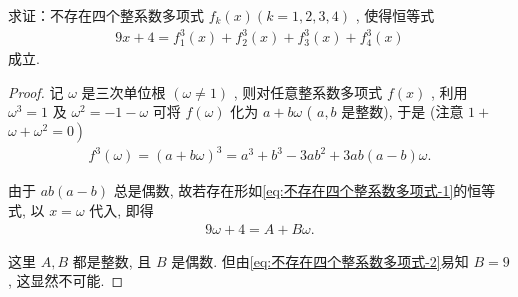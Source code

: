 \begin{comment}
\begin{example}
	试求一切有序正整数对 $(n, k)$, 使得 $x^n+x+1$ 被 $x^k+x+1$ 整除.
\end{example}
\begin{solution}
	显然,  $n \geqslant k$ .
	当 $n>k$ 时, 设 $\omega$ 是 $x^k+x+1=0$ 的一个根, 则 $\omega \neq 0, \omega^n+\omega+1=0$,于是
	\begin{align*}
		\omega^n-\omega^k=\omega^k\left(\omega^{n-k}-1\right)=0 .
	\end{align*}

	从而有
	\begin{align*}
		\omega^{n-k}=1 .
	\end{align*}

	由 $|\omega|^{n-k}=\left|\omega^{n-k}\right|=1$, 知 $|\omega|=1$ .
	由 $1=|\omega|^k=\left|\omega^k\right|=|\omega+1|$, 可知 $\omega$ 的实部为 $-\frac{1}{2}$, 则 $k \geqslant 2$.
	$\omega_1=\frac{-1+\sqrt{3} \mathrm{i}}{2}$ 或 $\omega_2=\frac{-1-\sqrt{3} \mathrm{i}}{2}$ 是 $x^k+x+1=0$ 的所有根, 从而有
	\begin{align*}
		x^k+x+1=\left(x-\omega_1\right)^{k_1}\left(x-\omega_2\right)^{k-k_1}, k_1 \in \mathbb{Z}, 0 \leqslant k_1 \leqslant k .
	\end{align*}

	若 $k>2$, 考虑上面等式两边含 $x^{k-1}$ 的项的系数, 便有 $k_1 \omega_1+\left(k-k_1\right) \omega_2=$ 0 , 考虑实部即有 $k=0$, 产生矛盾.

	若 $k=2$, 令 $n \equiv l(\bmod 3), 0 \leqslant l<3$. 由 $\omega^n+\omega+1=\omega^l+\omega+1=0$,得 $l=2, n \equiv 2(\bmod 3)$ .
	故知 $(n, k)=(k, k)$ 或 $(3 m+2,2), m$ 是正整数.
\end{solution}
\end{comment}

\begin{example}
	求证：不存在四个整系数多项式 $f_k(x)(k=1,2,3,4)$ , 使得恒等式
	\begin{align}\label{eq:不存在四个整系数多项式-1}
		9 x+4=f_1^3(x)+f_2^3(x)+f_3^3(x)+f_4^3(x)
	\end{align}
	成立.
\end{example}
\begin{proof}
	记 $\omega$ 是三次单位根 $(\omega \neq 1)$ , 则对任意整系数多项式 $f(x)$ , 利用 $\omega^3=1$ 及 $\omega^2=-1-\omega$ 可将 $f(\omega)$ 化为 $a+b \omega$ ( $a ,  b$ 是整数), 于是 (注意 $1+$ $\left.\omega+\omega^2=0\right)$
	\begin{align*}
		f^3(\omega)=(a+b \omega)^3=a^3+b^3-3 a b^2+3 a b(a-b) \omega .
	\end{align*}

	由于 $a b(a-b)$ 总是偶数, 故若存在形如\autoref{eq:不存在四个整系数多项式-1}的恒等式, 以 $x=\omega$ 代入, 即得
	\begin{align}\label{eq:不存在四个整系数多项式-2}
		9 \omega+4=A+B \omega .
	\end{align}

	这里 $A ,  B$ 都是整数, 且 $B$ 是偶数. 但由\autoref{eq:不存在四个整系数多项式-2}易知 $B=9$, 这显然不可能.
\end{proof}

